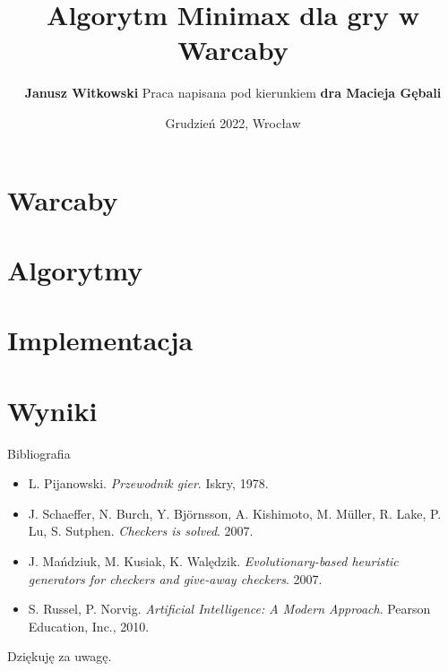 \documentclass{beamer}
\title{Algorytm Minimax dla gry w Warcaby}
\author{
	\textbf{Janusz Witkowski}
	\newline \newline
	Praca napisana pod kierunkiem \textbf{dra Macieja Gębali}
}
\date{Grudzień 2022, Wrocław}
\newcommand{\myitem}{\item[$\vartriangleright$]}
\begin{document}
\begin{frame}[plain]{}
	\titlepage
\end{frame}


\section{Warcaby}

\section{Algorytmy}

\section{Implementacja}


% 
% 
% 

\section{Wyniki}



% 

% 
% 
% 

\begin{frame}{Bibliografia}
	\begin{center}
		\begin{itemize}
			\myitem L. Pijanowski. \textit{Przewodnik gier}. Iskry, 1978.
			\myitem J. Schaeffer, N. Burch, Y. Björnsson, A. Kishimoto, M. Müller, R. Lake, P. Lu, S. Sutphen. \textit{Checkers is solved}. 2007.
			\myitem J. Mańdziuk, M. Kusiak, K. Walędzik. \textit{Evolutionary-based heuristic generators for checkers and give-away checkers}. 2007.
			\myitem S. Russel, P. Norvig. \textit{Artificial Intelligence: A Modern Approach}. Pearson Education, Inc., 2010.
		\end{itemize}
	\end{center}
\end{frame}

\begin{frame}{}
	\begin{center}
		\large{Dziękuję za uwagę.}
	\end{center}
\end{frame}


\end{document}
